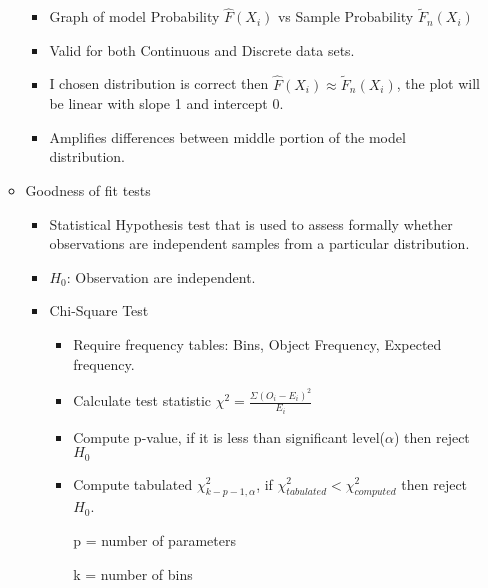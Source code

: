 \documentclass[a4paper]{article}
\begin{document}
\begin{enumerate}
\begin{itemize}
\begin{itemize}
				\item Graph of model Probability $\hat{F}(X_{i})$ vs Sample Probability $\tilde{F}_{n}(X_{i})$
				\item Valid for both Continuous and Discrete data sets.
				\item I chosen distribution is correct then $\hat{F}(X_{i})\approx \tilde{F}_{n}(X_{i})$, the plot will be linear with slope 1 and intercept 0.
				\item Amplifies differences between middle portion of the model distribution.
			\end{itemize}
			\item Goodness of fit tests
			\begin{itemize}
				\item Statistical Hypothesis test that is used to assess formally whether observations are independent samples from a particular distribution.
				\item $H_{0}$: Observation are independent.
				\item Chi-Square Test
				\begin{itemize}
					\item Require frequency tables: Bins, Object Frequency, Expected frequency.
					\item Calculate test statistic $\chi^{2} = \frac{\Sigma(O_{i} - E_{i})^{2}}{E_{i}}$
					\item Compute p-value, if it is less than significant level($\alpha$) then reject $H_{0}$
					\item Compute tabulated $\chi^{2}_{k - p - 1, \alpha}$, if $\chi^{2}_{tabulated} < \chi^{2}_{computed}$ then reject $H_{0}$.
					
					p = number of parameters
					
					k = number of bins
				\end{itemize}
			\end{itemize}
		\end{itemize}
	\end{enumerate}
\end{document}
